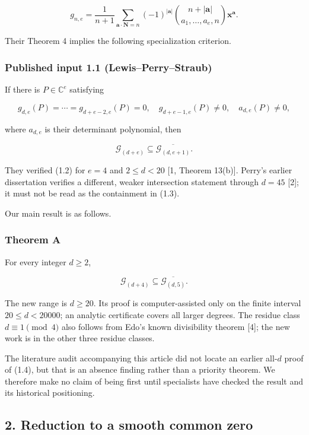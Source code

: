 \documentclass[
  11pt,
  a4paper,
]{article}
\begin{document}
\[
g_{n,e}=\frac1{n+1}
\sum_{\mathbf a\cdot\mathbf N=n}(-1)^{|\mathbf a|}
\binom{n+|\mathbf a|}{a_1,\ldots,a_e,n}\mathbf x^{\mathbf a}.
\tag{1.1}
\]

Their Theorem 4 implies the following specialization criterion.

\subsubsection{Published input 1.1
(Lewis--Perry--Straub)}\label{published-input-1.1-lewisperrystraub}

If there is \(P\in\mathbb C^e\) satisfying

\[
g_{d,e}(P)=\cdots=g_{d+e-2,e}(P)=0,
\quad
g_{d+e-1,e}(P)\ne0,
\quad
a_{d,e}(P)\ne0,
\tag{1.2}
\]

where \(a_{d,e}\) is their determinant polynomial, then

\[
\mathcal G_{(d+e)}\subseteq
\overline{\mathcal G_{(d,e+1)}}.
\tag{1.3}
\]

They verified (1.2) for \(e=4\) and \(2\le d<20\) {[}1, Theorem
13(b){]}. Perry's earlier dissertation verifies a different, weaker
intersection statement through \(d=45\) {[}2{]}; it must not be read as
the containment in (1.3).

Our main result is as follows.

\subsubsection{Theorem A}\label{theorem-a}

For every integer \(d\ge2\),

\[
\boxed{\mathcal G_{(d+4)}\subseteq
\overline{\mathcal G_{(d,5)}}.}
\tag{1.4}
\]

The new range is \(d\ge20\). Its proof is computer-assisted only on the
finite interval \(20\le d<20000\); an analytic certificate covers all
larger degrees. The residue class \(d\equiv1\pmod4\) also follows from
Edo's known divisibility theorem {[}4{]}; the new work is in the other
three residue classes.

The literature audit accompanying this article did not locate an earlier
all-\(d\) proof of (1.4), but that is an absence finding rather than a
priority theorem. We therefore make no claim of being first until
specialists have checked the result and its historical positioning.

\subsection{2. Reduction to a smooth common
zero}\label{reduction-to-a-smooth-common-zero}
\end{document}
